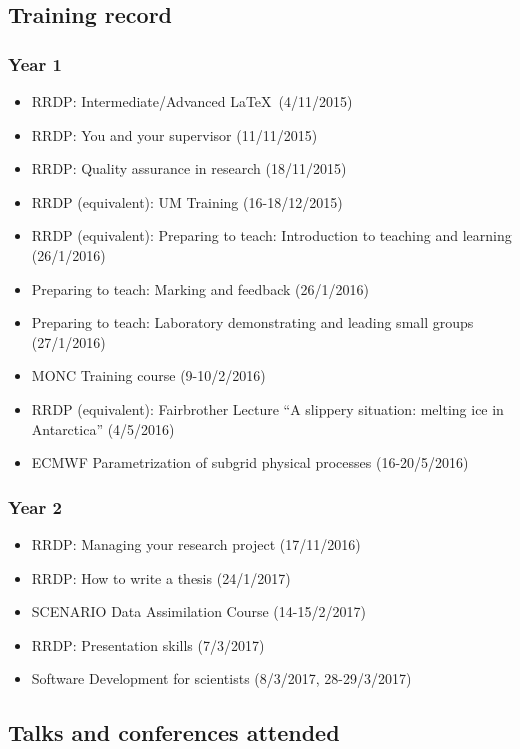 \documentclass[11pt,a4paper]{article}
\begin{document}
\subsection*{Training record}
\subsubsection*{Year 1}

\begin{itemize}
  \item RRDP: Intermediate/Advanced \LaTeX\ (4/11/2015)
  \item RRDP: You and your supervisor (11/11/2015)
  \item RRDP: Quality assurance in research (18/11/2015)
  \item RRDP (equivalent): UM Training (16-18/12/2015)
  \item RRDP (equivalent): Preparing to teach: Introduction to teaching and learning (26/1/2016)
  \item Preparing to teach: Marking and feedback (26/1/2016)
  \item Preparing to teach: Laboratory demonstrating and leading small groups (27/1/2016)
  \item MONC Training course (9-10/2/2016)
  \item RRDP (equivalent): Fairbrother Lecture ``A slippery situation: melting ice in Antarctica'' (4/5/2016)
  \item ECMWF Parametrization of subgrid physical processes (16-20/5/2016)
\end{itemize}

\subsubsection*{Year 2}

\begin{itemize}
  \item RRDP: Managing your research project (17/11/2016)
  \item RRDP: How to write a thesis (24/1/2017)
  \item SCENARIO Data Assimilation Course (14-15/2/2017)
  \item RRDP: Presentation skills (7/3/2017)
  \item Software Development for scientists (8/3/2017, 28-29/3/2017)
\end{itemize}

\subsection*{Talks and conferences attended}
\end{document}

